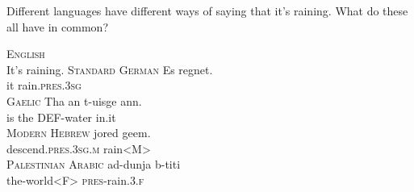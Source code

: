 \documentclass{article}
\begin{document}
Different languages have different ways of saying that it's raining. What do these all have in common?

\ea \label{ex:top3}
    \ea \textsc{English}\\
        It's raining.
    \ex \textsc{Standard German}
        \gll Es regnet. \\
        it rain.\textsc{pres.3sg} \\
    \ex \textsc{Gaelic}
        \gll Tha an t-uisge ann. \\
         is the \textsc{DEF}-water in.it \\
    \ex \textsc{Modern Hebrew}
        \gll jored geem. \\
        descend.\textsc{pres.3sg.m} rain\textsc{<M>} \\
    \ex \textsc{Palestinian Arabic}
        \gll ad-dunja b-titi \\
        the-world\textsc{<F>} \textsc{pres}-rain.\textsc{3.f} \\
    \z
\z
\end{document}
